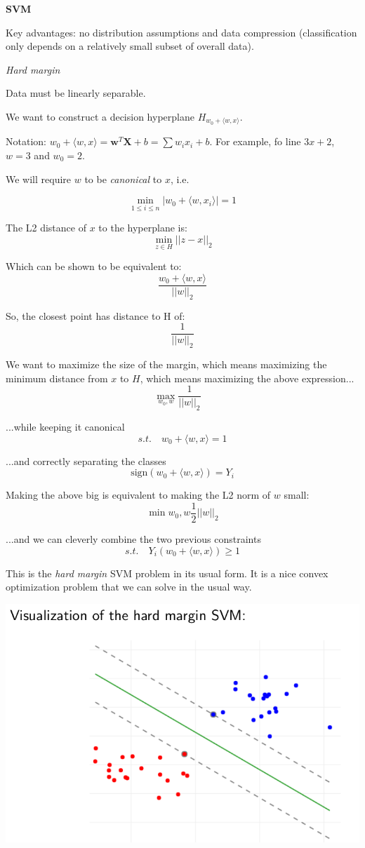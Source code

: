 \documentclass{minimal}
\begin{document}
\medskip

\textbf{SVM}

Key advantages: no distribution assumptions and data compression (classification
only depends on a relatively small subset of overall data).

\smallskip

\textit{Hard margin}

Data must be linearly separable.

We want to construct a decision hyperplane $H_{w_0 + \langle w, x \rangle}$. 

Notation:
$w_0 + \langle w, x \rangle = \mathbf{w}^T\mathbf{X} + b = \sum w_ix_i + b$. For
example, fo line $3x+2$, $w=3$ and $w_0 = 2$.

We will require $w$ to be \textit{canonical} to $x$, i.e.

$$
\min_{1 \leq i \leq n} |w_0 + \langle w, x_i \rangle| = 1
$$

The L2 distance of $x$ to the hyperplane is:
$$
\min_{z \in H}||z-x||_2
$$

Which can be shown to be equivalent to:
$$
\frac{w_0 + \langle w, x \rangle}{||w||_2}
$$

So, the closest point has distance to H of:
$$
\frac{1}{||w||_2}
$$

We want to maximize the size of the margin, which means maximizing the minimum
distance from $x$ to $H$, which means maximizing the above expression...
$$
\max_{w_0, w}  \frac{1}{||w||_2} \quad 
$$

...while keeping it canonical
$$
s.t. \quad w_0 + \langle w, x \rangle = 1 
$$

...and correctly separating the classes
$$
\mathrm{sign}(w_0 + \langle w, x \rangle) = Y_i
$$

Making the above big is equivalent to making the L2 norm of $w$ small:
$$
\min{w_0, w} \frac{1}{2}||w||_2
$$

...and we can cleverly combine the two previous constraints
$$
s.t. \quad Y_i(w_0 + \langle w, x \rangle)\geq 1
$$

This is the \textit{hard margin} SVM problem in its usual form.
It is a nice convex optimization problem that we can solve in the usual way.

\includegraphics[scale=0.25]{svm1}
\end{document}
